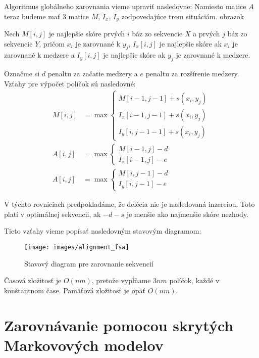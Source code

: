 Algoritmus globálneho zarovnania vieme upraviť nasledovne: Namiesto matice $A$ teraz budeme mať 3 matice $M$, $I_x$, $I_y$ zodpovedajúce trom situáciám. \todo obrazok

Nech $M[i,j]$ je najlepšie skóre prvých $i$ báz zo sekvencie $X$ a prvých $j$ báz zo sekvencie $Y$, pričom $x_i$ je zarovnané k $y_j$, $I_x[i,j]$ je najlepšie skóre ak $x_i$ je zarovnané k medzere a $I_y[i,j]$ je najlepšie skóre ak $y_j$ je zarovnané k medzere.

Označme si $d$ penaltu za začatie medzery a $e$ penaltu za rozšírenie medzery. Vzťahy pre výpočet políčok sú nasledovné:
\begin{align*}
M[i,j] &= \max \left\{
\begin{array}{l}
M[i-1,j-1]+s(x_i, y_j)\\
I_x[i-1,j-1]+s(x_i, y_j)\\
I_y[i,j-1-1]+s(x_i, y_j)
\end{array} \right.\\
A[i,j] &= \max \left\{
\begin{array}{l}
M[i-1,j]-d\\
I_x[i-1,j]-e
\end{array} \right.\\
A[i,j] &= \max \left\{
\begin{array}{l}
M[i,j-1]-d\\
I_y[i,j-1]-e
\end{array} \right.
\end{align*}

V týchto rovniciach predpokladáme, že delécia nie je nasledovaná inzerciou. Toto platí v optimálnej sekvencii, ak $-d-s$ je menšie ako najmenšie skóre nezhody.

Tieto vzťahy vieme popísať nasledovným stavovým diagramom:
\begin{figure}[htp]
    \centering
    \texttt{[image: images/alignment\_fsa]}
    \caption{Stavový diagram pre zarovnanie sekvencií}
    \label{fig:alignment-fsa}
\end{figure}

Časová zložitosť je $O(nm)$, pretože vypĺňame $3nm$ políčok, každé v konštantnom čase. Pamäťová zložitosť je opäť $O(nm)$.

\cite{durbin}

\section[Zarovnávanie s HMM]{Zarovnávanie pomocou skrytých Markovových modelov}

